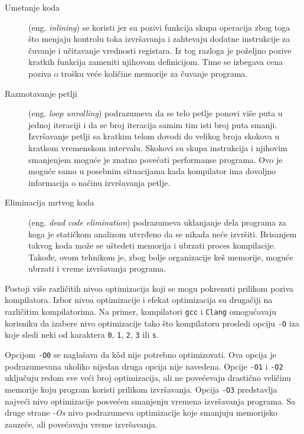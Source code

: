 \documentclass[12pt,oneside]{memoir}
\begin{document}
\begin{description}
    \item[Umetanje koda] (eng. \textit{inlining}) se koristi jer su pozivi funkcija skupa operacija zbog toga što menjaju kontrolu toka izvršavanja i zahtevaju dodatne instrukcije za čuvanje i učitavanje vrednosti registara. Iz tog razloga je poželjno pozive kratkih funkcija zameniti njihovom definicijom. Time se izbegava cena poziva o trošku veće količine memorije za čuvanje programa.
    \item[Razmotavanje petlji] (eng. \textit{loop unrolling}) podrazumeva da se telo petlje ponovi više puta u jednoj iteraciji i da se broj iteracija samim tim isti broj puta smanji. Izvršavanje petlji sa kratkim telom dovodi do velikog broja skokova u kratkom vremenskom intervalu. Skokovi su skupa instrukcija i njihovim smanjenjem moguće je znatno povećati performanse programa. Ovo je moguće samo u posebnim situacijama kada kompilator ima dovoljno informacija o načinu izvršavanja petlje.

    \item[Eliminacija mrtvog koda] (eng. \textit{dead code elimination}) podrazumeva uklanjanje dela programa za koga je statičkom analizom utvrđeno da se nikada neće izvršiti. Brisanjem takvog koda može se uštedeti memorija i ubrzati proces kompilacije. Takođe, ovom tehnikom je, zbog bolje organizacije keš memorije, moguće ubrzati i vreme izvršavanja programa.
\end{description}

Postoji više različitih nivoa optimizacija koji se mogu pokrenuti prilikom poziva kompilatora. Izbor nivoa optimizacije i efekat optimizacija su drugačiji na različitim kompilatorima. Na primer, kompilatori \texttt{gcc} i \texttt{Clang} omogućavaju korisniku da izabere nivo optimizacije tako što kompilatoru prosledi opciju \texttt{-O} iza koje sledi neki od karaktera \texttt{0}, \texttt{1}, \texttt{2}, \texttt{3} ili \texttt{s}. 

Opcijom \texttt{-O0} se naglašava da k\^od nije potrebno optimizovati. Ova opcija je podrazumevana ukoliko nijedan druga opcija nije navedena. Opcije \texttt{-O1} i \texttt{-O2} uključuju redom sve veći broj optimizacija, ali ne povećevaju drastično veličinu memorije koju program koristi prilikom izvršavanja. Opcija \texttt{-O3} predstavlja najveći nivo optimizacije posvećen smanjenju vremena izvršavanja programa. Sa druge strane \textit{-Os} nivo podrazumeva optimizacije koje smanjuju memorijsko zauzeće, ali povećavaju vreme izvršavanja. 
\end{document}
